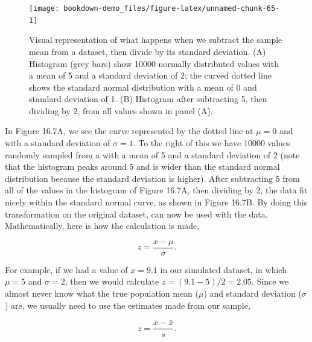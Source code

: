 \documentclass[
  openany]{krantz}
\begin{document}
\begin{figure}
\texttt{[image: bookdown-demo\_files/figure-latex/unnamed-chunk-65-1]} \caption{Visual representation of what happens when we subtract the sample mean from a dataset, then divide by its standard deviation. (A) Histogram (grey bars) show 10000 normally distributed values with a mean of 5 and a standard deviation of 2; the curved dotted line shows the standard normal distribution with a mean of 0 and standard deviation of 1. (B) Histogram after subtracting 5, then dividing by 2, from all values shown in panel (A).}\label{fig:unnamed-chunk-65}
\end{figure}

In Figure 16.7A, we see the  curve represented by the dotted line at \(\mu = 0\) and with a standard deviation of \(\sigma = 1\).
To the right of this  we have 10000 values randomly sampled from a  with a mean of 5 and a standard deviation of 2 (note that the histogram peaks around 5 and is wider than the standard normal distribution because the standard deviation is higher).
After subtracting 5 from all of the values in the histogram of Figure 16.7A, then dividing by 2, the data fit nicely within the standard normal curve, as shown in Figure 16.7B.
By doing this transformation on the original dataset,  can now be used with the data.
Mathematically, here is how the calculation is made,

\[z = \frac{x - \mu}{\sigma}.\]

For example, if we had a value of \(x = 9.1\) in our simulated dataset, in which \(\mu = 5\) and \(\sigma = 2\), then we would calculate \(z = (9.1 - 5) / 2 = 2.05\).
Since we almost never know what the true population mean (\(\mu\)) and standard deviation (\(\sigma\)) are, we usually need to use the estimates made from our sample,

\[z = \frac{x - \bar{x}}{s}.\]
\end{document}
